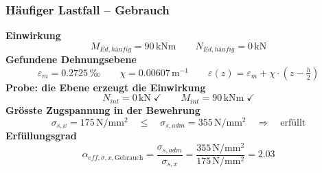 \documentclass[11pt,a4paper]{article}
\begin{document}
\subsubsection{Häufiger Lastfall – Gebrauch}
\noindent\textbf{Einwirkung}
\begin{equation*}
M_{Ed,häufig} = 90\,\mathrm{kNm} \qquad N_{Ed,häufig} = 0\,\mathrm{kN}
\end{equation*}
\noindent\textbf{Gefundene Dehnungsebene}
\begin{equation*}
\varepsilon_m = 0.2725\,\text{‰} \qquad \chi = 0.00607\,\mathrm{m}^{-1} \qquad \varepsilon(z) = \varepsilon_m + \chi \cdot \left(z - \tfrac{h}{2}\right)
\end{equation*}
\noindent\textbf{Probe: die Ebene erzeugt die Einwirkung}
\begin{equation*}
N_{int} = 0\,\mathrm{kN} \;\checkmark \qquad M_{int} = 90\,\mathrm{kNm} \;\checkmark
\end{equation*}
\noindent\textbf{Grösste Zugspannung in der Bewehrung}
\begin{equation*}
\sigma_{s,x} = 175\,\mathrm{N}/\mathrm{mm}^{2} \quad \le \quad \sigma_{s,adm} = 355\,\mathrm{N}/\mathrm{mm}^{2} \quad \Rightarrow \quad \text{erfüllt}
\end{equation*}
\noindent\textbf{Erfüllungsgrad}
\begin{equation*}
\alpha_{eff,\sigma,x,\text{Gebrauch}} = \frac{\sigma_{s,adm}}{\sigma_{s,x}} = \frac{355\,\mathrm{N}/\mathrm{mm}^{2}}{175\,\mathrm{N}/\mathrm{mm}^{2}} = 2.03
\end{equation*}
\end{document}
